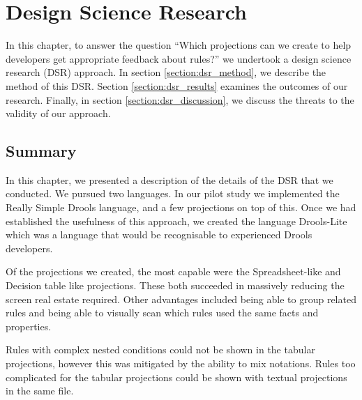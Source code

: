 \chapter{Design Science Research}
\label{chapter:DSR}

In this chapter, to answer the question ``Which projections can we create to help developers get appropriate feedback about rules?'' we undertook a design science research (DSR) approach.
In section \ref{section:dsr_method}, we describe the method of this DSR.
Section \ref{section:dsr_results} examines the outcomes of our research.
Finally, in section \ref{section:dsr_discussion}, we discuss the threats to the validity of our approach.







\section{Summary}
In this chapter, we presented a description of the details of the DSR that we conducted.
We pursued two languages.
In our pilot study we implemented the Really Simple Drools language, and a few projections on top of this.
Once we had established the usefulness of this approach, we created the language Drools-Lite which was a language that would be recognisable to experienced Drools developers.

Of the projections we created, the most capable were the Spreadsheet-like and Decision table like projections.
These both succeeded in massively reducing the screen real estate required.
Other advantages included being able to group related rules and being able to visually scan which rules used the same facts and properties.

Rules with complex nested conditions could not be shown in the tabular projections, however this was mitigated by the ability to mix notations.
Rules too complicated for the tabular projections could be shown with textual projections in the same file.